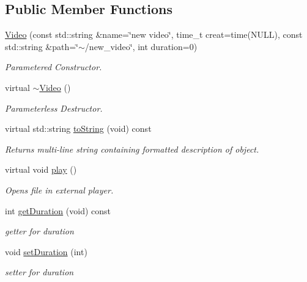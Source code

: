 \subsection*{Public Member Functions}
\begin{DoxyCompactItemize}
\item 
\hypertarget{classVideo_aa360b390158aec7378c1dceb8602138b}{\hyperlink{classVideo_aa360b390158aec7378c1dceb8602138b}{Video} (const std\+::string \&name=\char`\"{}new video\char`\"{}, time\+\_\+t creat=time(N\+U\+L\+L), const std\+::string \&path=\char`\"{}$\sim$/new\+\_\+video\char`\"{}, int duration=0)}\label{classVideo_aa360b390158aec7378c1dceb8602138b}

\begin{DoxyCompactList}\small\item\em Parametered Constructor. \end{DoxyCompactList}\item 
virtual \hyperlink{classVideo_aebf7e2a8fa2bbd79335b1cf35925d190}{$\sim$\+Video} ()
\begin{DoxyCompactList}\small\item\em Parameterless Destructor. \end{DoxyCompactList}\item 
\hypertarget{classVideo_af09cd9142969d63b514a251769fbed86}{virtual std\+::string \hyperlink{classVideo_af09cd9142969d63b514a251769fbed86}{to\+String} (void) const }\label{classVideo_af09cd9142969d63b514a251769fbed86}

\begin{DoxyCompactList}\small\item\em Returns multi-\/line string containing formatted description of object. \end{DoxyCompactList}\item 
\hypertarget{classVideo_a192acb2bbb1592566ec2393dc99e3083}{virtual void \hyperlink{classVideo_a192acb2bbb1592566ec2393dc99e3083}{play} ()}\label{classVideo_a192acb2bbb1592566ec2393dc99e3083}

\begin{DoxyCompactList}\small\item\em Opens file in external player. \end{DoxyCompactList}\item 
\hypertarget{classVideo_a1a495dbb8b0389e092758c62144ebc45}{int \hyperlink{classVideo_a1a495dbb8b0389e092758c62144ebc45}{get\+Duration} (void) const }\label{classVideo_a1a495dbb8b0389e092758c62144ebc45}

\begin{DoxyCompactList}\small\item\em getter for duration \end{DoxyCompactList}\item 
\hypertarget{classVideo_a0fbbf03b902423efa2179142902bb0d0}{void \hyperlink{classVideo_a0fbbf03b902423efa2179142902bb0d0}{set\+Duration} (int)}\label{classVideo_a0fbbf03b902423efa2179142902bb0d0}

\begin{DoxyCompactList}\small\item\em setter for duration \end{DoxyCompactList}\end{DoxyCompactItemize}


